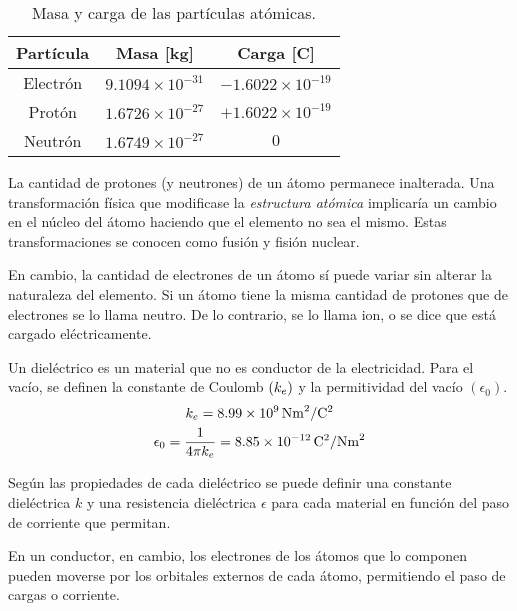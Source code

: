 \documentclass[a5paper,12pt,twoside]{book}
\begin{document}
\begin{table}[h!]
    \begin{center}
        \begin{tabular}{|c|c|c|}
            \hline
            Partícula & Masa [\si{\kilo\gram}] & Carga [\si{\coulomb}]
            \\ \hline \hline
            Electrón & $9.1094 \times 10^{-31}$ & $-1.6022 \times 10^{-19}$
            \\ \hline
            Protón & $1.6726 \times 10^{-27}$ & $+1.6022 \times 10^{-19}$
            \\ \hline
            Neutrón & $1.6749 \times 10^{-27}$ & $0$
            \\ \hline
        \end{tabular}
        \caption{Masa y carga de las partículas atómicas.}
    \end{center}
\end{table}

La cantidad de protones (y neutrones) de un átomo permanece inalterada.
Una transformación física que modificase la \emph{estructura atómica} implicaría un cambio en el núcleo del átomo haciendo que el elemento no sea el mismo.
Estas transformaciones se conocen como fusión y fisión nuclear.

En cambio, la cantidad de electrones de un átomo sí puede variar sin alterar la naturaleza del elemento.
Si un átomo tiene la misma cantidad de protones que de electrones se lo llama neutro.
De lo contrario, se lo llama ion, o se dice que está cargado eléctricamente.


Un dieléctrico es un material que no es conductor de la electricidad.
Para el vacío, se definen la constante de Coulomb $(k_e)$ y la permitividad del vacío $(\epsilon_0)$.
\begin{gather*}
    k_e=8.99 \times 10^9\,\si{\newton\metre^2\per\coulomb^2}
    \\
    \epsilon_0 = \dfrac{1}{4 \pi k_e} = 8.85 \times 10^{-12} \,\si{\coulomb^2\per\newton\metre^2}
\end{gather*}

Según las propiedades de cada dieléctrico se puede definir una constante dieléctrica $k$ y una resistencia dieléctrica $\epsilon$ para cada material en función del paso de corriente que permitan.

En un conductor, en cambio, los electrones de los átomos que lo componen pueden moverse por los orbitales externos de cada átomo, permitiendo el paso de cargas o corriente.
\end{document}
